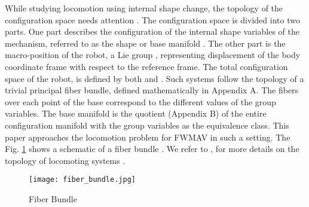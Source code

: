 \documentclass[letterpaper, 10 pt, conference]{ieeeconf}  \newcommand{\RN}[1]{\textup{\uppercase\expandafter{\romannumeral#1}}}
\begin{document}
While studying locomotion using internal shape change, the topology of the configuration space needs attention \cite{kelly murray}. The configuration space is divided into two parts. One part describes the configuration of the internal shape variables of the mechanism, referred to as the shape or base manifold . The other part is the macro-position of the robot, a Lie group , representing displacement of the body coordinate frame with respect to the reference frame. The total configuration space of the robot,  is defined by both  and . Such systems follow the topology of a trivial principal fiber bundle, defined mathematically in Appendix A. The fibers over each point of the base correspond to the different values of the group variables. The base manifold  is the quotient (Appendix B) of the entire configuration manifold  with the group variables as the equivalence class. This paper approaches the locomotion problem for FWMAV in such a setting. The Fig. \ref{fiber_bundle} shows a schematic of a fiber bundle \cite{wolfram_website}. We refer to \cite{Gallier}, \cite{Wilson} for more details on the topology of locomoting systems .

\begin{figure}[h!]
\centering
\texttt{[image: fiber\_bundle.jpg]} 
\caption{Fiber Bundle}
\label{fiber_bundle}
\end{figure}
\end{document}
